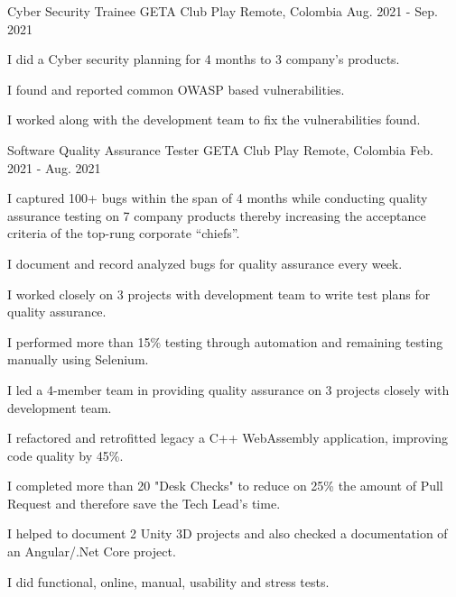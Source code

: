 \begin{cventries}
  \cventry
    {Cyber Security Trainee} %
    {GETA Club Play} %
    {Remote, Colombia} %
    {Aug. 2021 - Sep. 2021} %
    {
      \begin{cvitems} %
        \item {I did a Cyber security planning for 4 months to 3 company's products.}
        \item {I found and reported common OWASP based vulnerabilities.}
        \item {I worked along with the development team to fix the vulnerabilities found.}
      \end{cvitems}
    }

  \cventry
    {Software Quality Assurance Tester} %
    {GETA Club Play} %
    {Remote, Colombia} %
    {Feb. 2021 - Aug. 2021} %
    {
      \begin{cvitems} %
        \item {I captured 100+ bugs within the span of 4 months while conducting quality assurance
        testing on 7 company products thereby increasing the acceptance criteria of the top-rung
        corporate “chiefs”.}
        \item {I document and record analyzed bugs for quality assurance every week.}
        \item {I worked closely on 3 projects with development team to write test plans for quality
        assurance.}
        \item {I performed more than 15\% testing through automation and remaining testing manually
        using Selenium.}
        \item {I led a 4-member team in providing quality assurance on 3 projects closely with
        development team.}
        \item {I refactored and retrofitted legacy a C++ WebAssembly application, improving code
        quality by 45\%.}
        \item {I completed more than 20 "Desk Checks" to reduce on 25\% the amount of Pull Request
        and therefore save the Tech Lead's time.}
        \item {I helped to document 2 Unity 3D projects and also checked a documentation of an 
        Angular/.Net Core project.}
        \item {I did functional, online, manual, usability and stress tests.}
      \end{cvitems}
    }
\end{cventries}
